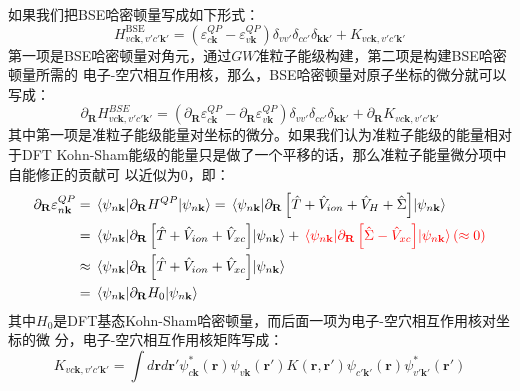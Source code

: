   如果我们把BSE哈密顿量写成如下形式：
  \begin{equation}
    H_{vc\mathbf{k},v'c'\mathbf{k}'}^{\mathrm{BSE}}
    =
    (\varepsilon_{c\mathbf{k}}^{QP} - \varepsilon_{v\mathbf{k}}^{QP})
    \delta_{vv'}\delta_{cc'}\delta_{\mathbf{kk'}}
    +
    K_{vc\mathbf{k},v'c'\mathbf{k}'}
  \end{equation}
  第一项是BSE哈密顿量对角元，通过$GW$准粒子能级构建，第二项是构建BSE哈密顿量所需的
  电子-空穴相互作用核，那么，BSE哈密顿量对原子坐标的微分就可以写成：
  \begin{equation}
    \partial_\mathbf{R}
    H_{vc\mathbf{k},v'c'\mathbf{k}'}^{BSE}
    =
    (\partial_\mathbf{R}\varepsilon_{c\mathbf{k}}^{QP} - \partial_\mathbf{R}\varepsilon_{v\mathbf{k}}^{QP})
    \delta_{vv'}\delta_{cc'}\delta_{\mathbf{kk'}}
    +
    \partial_\mathbf{R}K_{vc\mathbf{k},v'c'\mathbf{k}'}
  \end{equation}
  其中第一项是准粒子能级能量对坐标的微分。如果我们认为准粒子能级的能量相对于DFT
  Kohn-Sham能级的能量只是做了一个平移的话，那么准粒子能量微分项中自能修正的贡献可
  以近似为0，即：
  \begin{align}
    \partial_\mathbf{R}\varepsilon_{n\mathbf{k}}^{QP}
    &= \mel{\psi_{n\mathbf{k}}}{\partial_\mathbf{R} H^{QP}}{\psi_{n\mathbf{k}}}
      = \mel{\psi_{n\mathbf{k}}}{
      \partial_\mathbf{R}
      \left[\hat{T} + \hat{V}_{ion} +
      \hat{V}_H + \hat{\Sigma}\right]}{\psi_{n\mathbf{k}}}
      \nonumber \\
    &= \mel{\psi_{n\mathbf{k}}}{
      \partial_\mathbf{R}
      \left[\hat{T} + \hat{V}_{ion} +
      \hat{V}_{xc}\right]}{\psi_{n\mathbf{k}}}
      +
      {\color{red}
      \mel{\psi_{n\mathbf{k}}}{
      \partial_\mathbf{R}
      \left[\hat{\Sigma} - \hat{V}_{xc}\right]}{\psi_{n\mathbf{k}}}
      (\approx 0)
      }
      \nonumber \\
    &\approx \mel{\psi_{n\mathbf{k}}}{
      \partial_\mathbf{R}
      \left[\hat{T} + \hat{V}_{ion} +
      \hat{V}_{xc}\right]}{\psi_{n\mathbf{k}}}
      \nonumber \\
    &= \mel{\psi_{n\mathbf{k}}}{
      \partial_\mathbf{R} H_0
      }{\psi_{n\mathbf{k}}}
  \end{align}
  其中$H_0$是DFT基态Kohn-Sham哈密顿量，而后面一项为电子-空穴相互作用核对坐标的微
  分，电子-空穴相互作用核矩阵写成：
  \begin{equation}
  K_{vc\mathbf{k},v'c'\mathbf{k'}}=\int{d\mathbf{r}d\mathbf{r'}\psi_{c\mathbf{k}}^{*}(\mathbf{r})\psi_{v\mathbf{k}}(\mathbf{r'})K(\mathbf{r},\mathbf{r'})\psi_{c'\mathbf{k'}}(\mathbf{r})\psi_{v'\mathbf{k'}}^{*}(\mathbf{r'})}
  \end{equation}
